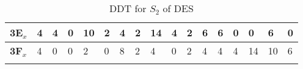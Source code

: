 \begin{longtable}[c]{|l|l|l|l|l|l|l|l|l|l|l|l|l|l|l|l|l|}
\textbf{3E$_x$} & 4              & 4              & 0              & 10             & 2              & 4              & 2              & 14             & 4              & 2              & 6              & 6              & 0              & 0              & 6              & 0              \\ \hline
\textbf{3F$_x$} & 4              & 0              & 0              & 2              & 0              & 8              & 2              & 4              & 0              & 2              & 4              & 4              & 4              & 14             & 10             & 6              \\ \hline
\caption{DDT for $S_2$ of DES}
\label{tab:ddt-s2-des}
\end{longtable}